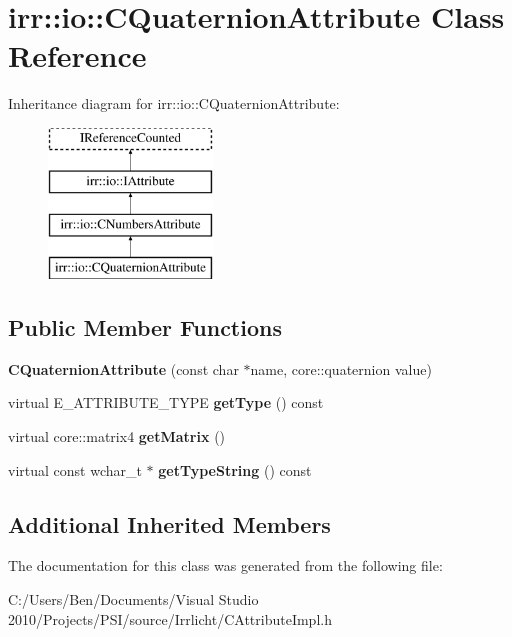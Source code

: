 \hypertarget{classirr_1_1io_1_1_c_quaternion_attribute}{\section{irr\-:\-:io\-:\-:C\-Quaternion\-Attribute Class Reference}
\label{classirr_1_1io_1_1_c_quaternion_attribute}
}
Inheritance diagram for irr\-:\-:io\-:\-:C\-Quaternion\-Attribute\-:\begin{figure}[H]
\begin{center}
\leavevmode
\includegraphics[height=4.000000cm]{classirr_1_1io_1_1_c_quaternion_attribute}
\end{center}
\end{figure}
\subsection*{Public Member Functions}
\begin{DoxyCompactItemize}
\item 
\hypertarget{classirr_1_1io_1_1_c_quaternion_attribute_ab831dbafa03a8930250d9462da2b31e3}{{\bfseries C\-Quaternion\-Attribute} (const char $\ast$name, core\-::quaternion value)}\label{classirr_1_1io_1_1_c_quaternion_attribute_ab831dbafa03a8930250d9462da2b31e3}

\item 
\hypertarget{classirr_1_1io_1_1_c_quaternion_attribute_a76785945977c8b9a80afdbfa9ac1f945}{virtual E\-\_\-\-A\-T\-T\-R\-I\-B\-U\-T\-E\-\_\-\-T\-Y\-P\-E {\bfseries get\-Type} () const }\label{classirr_1_1io_1_1_c_quaternion_attribute_a76785945977c8b9a80afdbfa9ac1f945}

\item 
\hypertarget{classirr_1_1io_1_1_c_quaternion_attribute_ac9e3fd7f0a1b984d7d6da95a976792da}{virtual core\-::matrix4 {\bfseries get\-Matrix} ()}\label{classirr_1_1io_1_1_c_quaternion_attribute_ac9e3fd7f0a1b984d7d6da95a976792da}

\item 
\hypertarget{classirr_1_1io_1_1_c_quaternion_attribute_ae09ca10158962572adc3fe63a61e8b74}{virtual const wchar\-\_\-t $\ast$ {\bfseries get\-Type\-String} () const }\label{classirr_1_1io_1_1_c_quaternion_attribute_ae09ca10158962572adc3fe63a61e8b74}

\end{DoxyCompactItemize}
\subsection*{Additional Inherited Members}


The documentation for this class was generated from the following file\-:\begin{DoxyCompactItemize}
\item 
C\-:/\-Users/\-Ben/\-Documents/\-Visual Studio 2010/\-Projects/\-P\-S\-I/source/\-Irrlicht/C\-Attribute\-Impl.\-h\end{DoxyCompactItemize}
